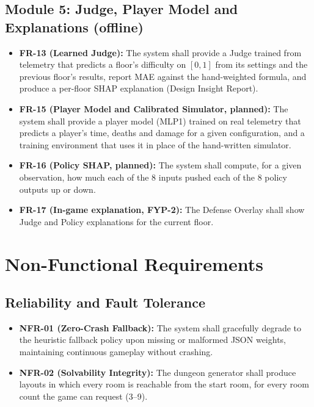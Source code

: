 \subsection{Module 5: Judge, Player Model and Explanations (offline)}
\begin{itemize}
    \item \textbf{FR-13 (Learned Judge):} The system shall provide a Judge trained from telemetry that predicts a floor's difficulty on $[0,1]$ from its settings and the previous floor's results, report MAE against the hand-weighted formula, and produce a per-floor SHAP explanation (Design Insight Report).
    \item \textbf{FR-15 (Player Model and Calibrated Simulator, planned):} The system shall provide a player model (MLP1) trained on real telemetry that predicts a player's time, deaths and damage for a given configuration, and a training environment that uses it in place of the hand-written simulator.
    \item \textbf{FR-16 (Policy SHAP, planned):} The system shall compute, for a given observation, how much each of the 8 inputs pushed each of the 8 policy outputs up or down.
    \item \textbf{FR-17 (In-game explanation, FYP-2):} The Defense Overlay shall show Judge and Policy explanations for the current floor.
\end{itemize}

\section{Non-Functional Requirements}

\subsection{Reliability and Fault Tolerance}
\begin{itemize}
    \item \textbf{NFR-01 (Zero-Crash Fallback):} The system shall gracefully degrade to the heuristic fallback policy upon missing or malformed JSON weights, maintaining continuous gameplay without crashing.
    \item \textbf{NFR-02 (Solvability Integrity):} The dungeon generator shall produce layouts in which every room is reachable from the start room, for every room count the game can request (3--9).
\end{itemize}

